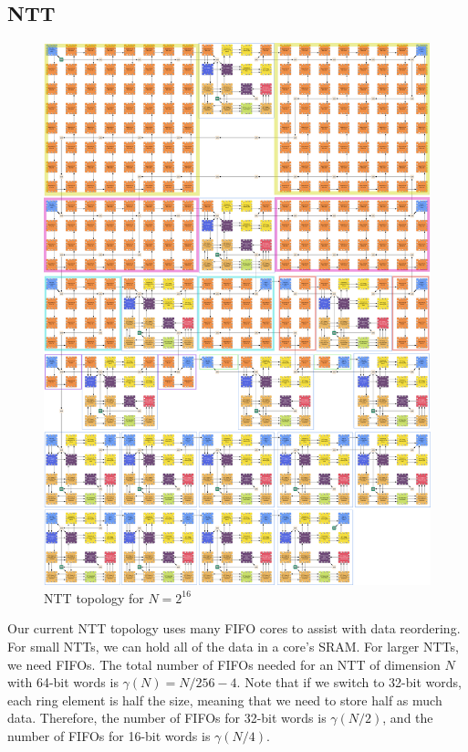 \documentclass[../../fheimpl.tex]{subfiles}
\begin{document}
	\subsection{NTT}
	\begin{figure}[H]
		\includegraphics[width=\textwidth,height=\textheight,keepaspectratio]{graphics/ntt.png}
		\caption{NTT topology for $N=2^{16}$}
		\label{fig:ntttopo}
	\end{figure}
	
	Our current NTT topology uses many FIFO cores to assist with data reordering. For small NTTs, we can hold all of the data in a core's SRAM. For larger NTTs, we need FIFOs. The total number of FIFOs needed for an NTT of dimension $N$ with 64-bit words is $\gamma(N)=N/256-4$. Note that if we switch to 32-bit words, each ring element is half the size, meaning that we need to store half as much data. Therefore, the number of FIFOs for 32-bit words is $\gamma(N/2)$, and the number of FIFOs for 16-bit words is $\gamma(N/4)$.
	
\end{document}
